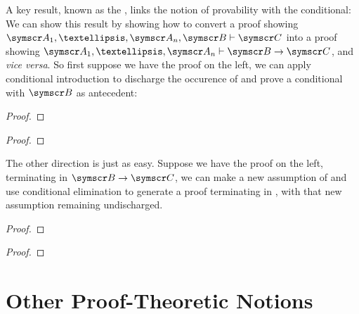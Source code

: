 A key result, known as the , links the notion of provability with the conditional:  We can show this result by showing how to convert a proof showing $\meta{A}_{1},…,\meta{A}_{n},\meta{B} \proves \meta{C}$ into a proof showing $\meta{A}_{1},…,\meta{A}_{n} \proves \meta{B} \to \meta{C}$, and \emph{vice versa}. So first suppose we have the proof on the left, we can apply conditional introduction to discharge the occurence of  and prove a conditional with $\meta{B}$ as antecedent:
    		 \begin{multicols}{2}\noindent\begin{proof}
    				\hypo[\ ]{}{\vdots}
    				\open
    				\open{}
    				\have[\ ]{}{\vdots}
    			\end{proof}
    			\begin{proof}
    				\hypo[\ ]{}{\vdots}
    				\open
    				\open{}
    				\have[\ ]{}{\vdots}
    				\close
    			\end{proof}\end{multicols}
The other direction is just as easy. Suppose we have the proof on the left, terminating in $\meta{B}\eif\meta{C}$, we can make a new assumption of  and use conditional elimination to generate a proof terminating in , with that new assumption remaining undischarged. 
 \begin{multicols}{2}\noindent\begin{proof}
    				\hypo[\ ]{}{\vdots}
    				\open
    				\have[\ ]{}{\vdots}
    			\end{proof} 
    			\begin{proof}
    				\hypo[\ ]{}{\vdots}
    				\open
    				\have[\ ]{}{\vdots}
    				\open
    			\end{proof}\end{multicols}

\section{Other Proof-Theoretic Notions}

